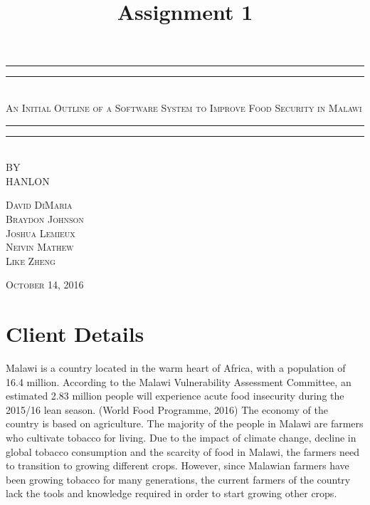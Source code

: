 \documentclass[12pt,letterpaper]{article}
\title{Assignment 1}
\begin{document}
\begin{titlepage}
    \centering
    \vspace*{\baselineskip}
    \rule{\textwidth}{1.6pt}\vspace*{-\baselineskip}\vspace*{2pt}
    \rule{\textwidth}{0.4pt}\\[1.5\baselineskip]
    {\LARGE \textsc{An Initial Outline of a Software System to Improve Food Security in Malawi}}\\[\baselineskip]
	\rule{\textwidth}{0.4pt}\vspace*{-\baselineskip}\vspace{4pt}    
    \rule{\textwidth}{2pt}\\[2\baselineskip]
   
    \vspace*{5\baselineskip}
    \textsc{BY}\\[0.25\baselineskip]
    {\LARGE HANLON} \\
    
    \vspace*{\baselineskip}
    {\textsc{David DiMaria \\ Braydon Johnson \\ Joshua Lemieux \\ Neivin Mathew \\ Like Zheng} \par}
    \vfill
    {\scshape October 14, 2016} \\
  \end{titlepage}
  
  
\tableofcontents
\lhead{} %
\clearpage
{} %
    
\section{Client Details}
Malawi is a country located in the warm heart of Africa, with a population of 16.4 million. According to the Malawi Vulnerability Assessment Committee, an estimated 2.83 million people will experience acute food insecurity during the 2015/16 lean season. (World Food Programme, 2016) The economy of the country is based on agriculture. The majority of the people in Malawi are farmers who cultivate tobacco for living. Due to the impact of climate change, decline in global tobacco consumption and the scarcity of food in Malawi, the farmers need to transition to growing different crops. However, since Malawian farmers have been growing tobacco for many generations, the current farmers of the country lack the tools and knowledge required in order to start growing other crops. 
\end{document}
